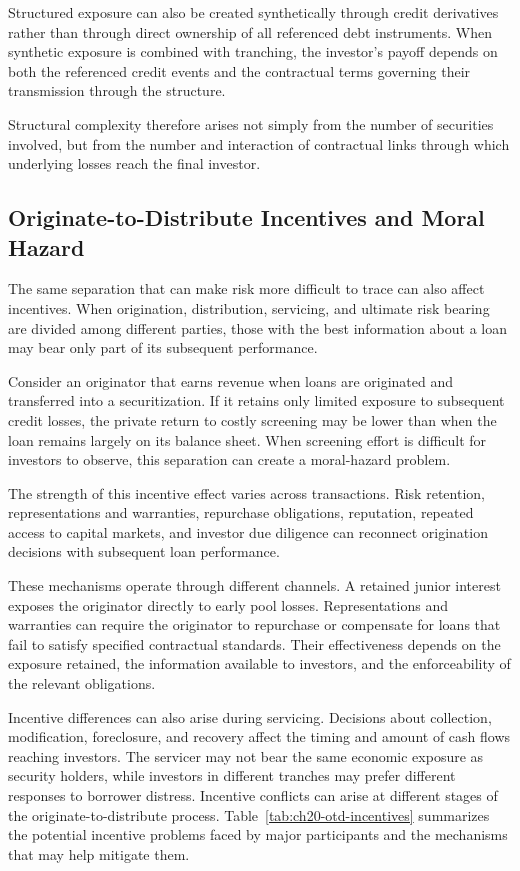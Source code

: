 Structured exposure can also be created synthetically through credit derivatives rather than through direct ownership of all referenced debt instruments. When synthetic exposure is combined with tranching, the investor's payoff depends on both the referenced credit events and the contractual terms governing their transmission through the structure.

Structural complexity therefore arises not simply from the number of securities involved, but from the number and interaction of contractual links through which underlying losses reach the final investor.

\subsection{Originate-to-Distribute Incentives and Moral Hazard}

The same separation that can make risk more difficult to trace can also affect incentives. When origination, distribution, servicing, and ultimate risk bearing are divided among different parties, those with the best information about a loan may bear only part of its subsequent performance.

Consider an originator that earns revenue when loans are originated and transferred into a securitization. If it retains only limited exposure to subsequent credit losses, the private return to costly screening may be lower than when the loan remains largely on its balance sheet. When screening effort is difficult for investors to observe, this separation can create a moral-hazard problem.

The strength of this incentive effect varies across transactions. Risk retention, representations and warranties, repurchase obligations, reputation, repeated access to capital markets, and investor due diligence can reconnect origination decisions with subsequent loan performance.

These mechanisms operate through different channels. A retained junior interest exposes the originator directly to early pool losses. Representations and warranties can require the originator to repurchase or compensate for loans that fail to satisfy specified contractual standards. Their effectiveness depends on the exposure retained, the information available to investors, and the enforceability of the relevant obligations.

Incentive differences can also arise during servicing. Decisions about collection, modification, foreclosure, and recovery affect the timing and amount of cash flows reaching investors. The servicer may not bear the same economic exposure as security holders, while investors in different tranches may prefer different responses to borrower distress. Incentive conflicts can arise at different stages of the originate-to-distribute process. Table~\ref{tab:ch20-otd-incentives} summarizes the potential incentive problems faced by major participants and the mechanisms that may help mitigate them.

